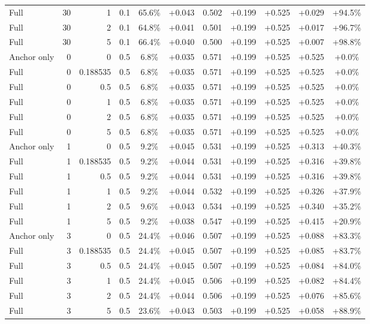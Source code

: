 \begin{table}[htbp]
\begin{tabular}{lrrrccccccc}
Full & 30 & 1 & 0.1 & 65.6\% & +0.043 & 0.502 & +0.199 & +0.525 & +0.029 & +94.5\% \\
Full & 30 & 2 & 0.1 & 64.8\% & +0.041 & 0.501 & +0.199 & +0.525 & +0.017 & +96.7\% \\
Full & 30 & 5 & 0.1 & 66.4\% & +0.040 & 0.500 & +0.199 & +0.525 & +0.007 & +98.8\% \\
Anchor only & 0 & 0 & 0.5 & 6.8\% & +0.035 & 0.571 & +0.199 & +0.525 & +0.525 & +0.0\% \\
Full & 0 & 0.188535 & 0.5 & 6.8\% & +0.035 & 0.571 & +0.199 & +0.525 & +0.525 & +0.0\% \\
Full & 0 & 0.5 & 0.5 & 6.8\% & +0.035 & 0.571 & +0.199 & +0.525 & +0.525 & +0.0\% \\
Full & 0 & 1 & 0.5 & 6.8\% & +0.035 & 0.571 & +0.199 & +0.525 & +0.525 & +0.0\% \\
Full & 0 & 2 & 0.5 & 6.8\% & +0.035 & 0.571 & +0.199 & +0.525 & +0.525 & +0.0\% \\
Full & 0 & 5 & 0.5 & 6.8\% & +0.035 & 0.571 & +0.199 & +0.525 & +0.525 & +0.0\% \\
Anchor only & 1 & 0 & 0.5 & 9.2\% & +0.045 & 0.531 & +0.199 & +0.525 & +0.313 & +40.3\% \\
Full & 1 & 0.188535 & 0.5 & 9.2\% & +0.044 & 0.531 & +0.199 & +0.525 & +0.316 & +39.8\% \\
Full & 1 & 0.5 & 0.5 & 9.2\% & +0.044 & 0.531 & +0.199 & +0.525 & +0.316 & +39.8\% \\
Full & 1 & 1 & 0.5 & 9.2\% & +0.044 & 0.532 & +0.199 & +0.525 & +0.326 & +37.9\% \\
Full & 1 & 2 & 0.5 & 9.6\% & +0.043 & 0.534 & +0.199 & +0.525 & +0.340 & +35.2\% \\
Full & 1 & 5 & 0.5 & 9.2\% & +0.038 & 0.547 & +0.199 & +0.525 & +0.415 & +20.9\% \\
Anchor only & 3 & 0 & 0.5 & 24.4\% & +0.046 & 0.507 & +0.199 & +0.525 & +0.088 & +83.3\% \\
Full & 3 & 0.188535 & 0.5 & 24.4\% & +0.045 & 0.507 & +0.199 & +0.525 & +0.085 & +83.7\% \\
Full & 3 & 0.5 & 0.5 & 24.4\% & +0.045 & 0.507 & +0.199 & +0.525 & +0.084 & +84.0\% \\
Full & 3 & 1 & 0.5 & 24.4\% & +0.045 & 0.506 & +0.199 & +0.525 & +0.082 & +84.4\% \\
Full & 3 & 2 & 0.5 & 24.4\% & +0.044 & 0.506 & +0.199 & +0.525 & +0.076 & +85.6\% \\
Full & 3 & 5 & 0.5 & 23.6\% & +0.043 & 0.503 & +0.199 & +0.525 & +0.058 & +88.9\% \\

\end{tabular}
\end{table}
